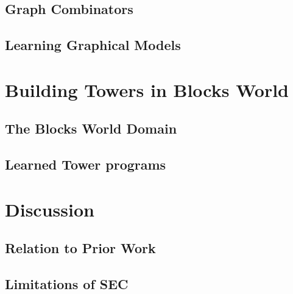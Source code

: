 \documentclass{article} %
\begin{document}
\subsection{Graph Combinators}

\subsection{Learning Graphical Models}

\section{Building Towers in Blocks World}

\subsection{The Blocks World Domain}

\subsection{Learned Tower programs}

\section{Discussion}

\subsection{Relation to Prior Work}

\subsection{Limitations of SEC}




\end{document}
